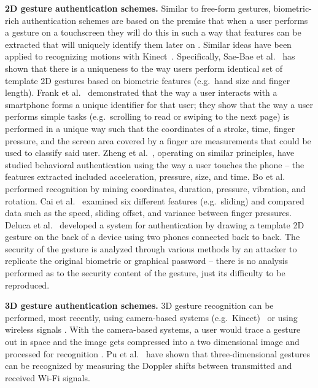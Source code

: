 \documentclass{sig-alternate-10pt}
\begin{document}
\textbf{2D gesture authentication schemes.}
Similar to free-form gestures, biometric-rich authentication schemes are based on the premise that when a user performs a gesture on a touchscreen they will do this in such a way that features can be extracted that will uniquely identify them later on \cite{touchalytics,Sae-Bae:2012:BGN:2207676.2208543, WM-CS-2012-06,Bo:2013:SSU:2500423.2504572}. Similar ideas have been applied to recognizing motions with Kinect~\cite{kinwrite}. Specifically, Sae-Bae et al.~\cite{Sae-Bae:2012:BGN:2207676.2208543} has shown that there is a uniqueness to the way users perform identical set of template 2D gestures based on biometric features (e.g.~hand size and finger length). Frank et al.~\cite{touchalytics} demonstrated that the way a user interacts with a smartphone forms a unique identifier for that user; they show that the way a user performs simple tasks (e.g.~scrolling to read or swiping to the next page)  is performed in a unique way such that the coordinates of a stroke, time, finger pressure, and the screen area covered by a finger are measurements that could be used to classify said user. Zheng et al.~\cite{WM-CS-2012-06}, operating on similar principles, have studied behavioral authentication using the way a user touches the phone -- the features extracted included acceleration, pressure, size, and time. Bo et al.~\cite{WM-CS-2012-06} performed recognition by mining coordinates, duration, pressure, vibration, and rotation.  Cai et al.~\cite{book} examined six different features (e.g.~sliding) and compared data such as the speed, sliding offset, and variance between finger pressures. Deluca et al.~\cite{DeLuca:2013:BAS:2470654.2481330} developed a system for authentication by drawing a template 2D gesture on the back of a device using two phones connected back to back. The security of the gesture is analyzed through various methods by an attacker to replicate the original biometric or graphical password -- there is no analysis performed as to the security content of the gesture, just its difficulty to be reproduced. 

\textbf{3D gesture authentication schemes.} 3D gesture recognition can be performed, most recently, using camera-based systems (e.g.~Kinect)~\cite{kinwrite} or using wireless signals \cite{Pu:2013:WGR:2500423.2500436}. With the camera-based systems, a user would trace a gesture out in space and the image gets compressed into a two dimensional image and processed for recognition \cite{kinwrite}.  Pu et al.~\cite{Pu:2013:WGR:2500423.2500436} have shown that three-dimensional gestures can be recognized by measuring the Doppler shifts between transmitted and received Wi-Fi signals.  
\end{document}
